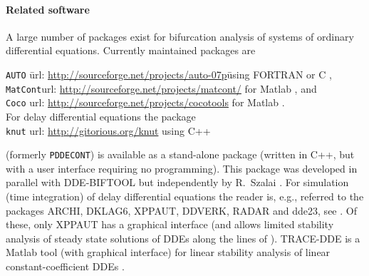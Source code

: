 \documentclass[10pt]{scrartcl}
\newcommand{\DDEBIFCODE}{\textsc{DDE-BIFTOOL}}
\newcommand{\ddebifweb}{\url{http://twr.cs.kuleuven.be/research/software/delay/ddebiftool.shtml}}
\begin{document}
\paragraph{Related software}
A large number of packages exist for bifurcation analysis of systems
of ordinary differential equations. Currently maintained packages are
\begin{tabbing}
  \texttt{AUTO}\qquad
  \= url: \url{http://sourceforge.net/projects/auto-07p}\qquad\=
  using FORTRAN or C \cite{Doed99,Doed07},\\
  \texttt{MatCont}\>url: \url{http://sourceforge.net/projects/matcont/}\>
  for Matlab \cite{DGK03,G00}, and\\
  \texttt{Coco}\> url: \url{http://sourceforge.net/projects/cocotools}\> for
  Matlab \cite{DS13}.\\[1ex]
  For delay differential equations the package\\[0.5ex]
  \texttt{knut}\> url: \url{http://gitorious.org/knut}\> using C++
\end{tabbing}
(formerly \texttt{PDDECONT}) is available as a
stand-alone package (written in C++, but with a user interface
requiring no programming). This package was developed in parallel with
\DDEBIFCODE{} but independently by R.~Szalai \cite{SSH06,RS07}.  For
simulation (time integration) of delay differential equations the
reader is, e.g., referred to the packages ARCHI, DKLAG6, XPPAUT,
DDVERK, RADAR and dde23, see
\cite{Paul95,Thom97,Erme98,Enri97,Sham00,Gugl07}.  Of these, only
XPPAUT has a graphical interface (and allows limited stability
analysis of steady state solutions of DDEs along the lines of
\cite{Luzy96}). TRACE-DDE is a Matlab tool (with graphical interface)
for linear stability analysis of linear constant-coefficient DDEs
\cite{breda09}.%
\end{document}
